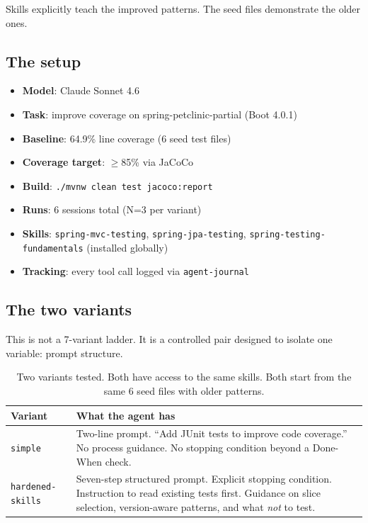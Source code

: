 \documentclass[11pt,a4paper]{article}
\begin{document}
Skills explicitly teach the improved patterns.
The seed files demonstrate the older ones.

\subsection*{The setup}

\begin{itemize}
  \item \textbf{Model}: Claude Sonnet 4.6
  \item \textbf{Task}: improve coverage on spring-petclinic-partial (Boot 4.0.1)
  \item \textbf{Baseline}: 64.9\% line coverage (6 seed test files)
  \item \textbf{Coverage target}: $\geq$85\% via JaCoCo
  \item \textbf{Build}: \texttt{./mvnw clean test jacoco:report}
  \item \textbf{Runs}: 6 sessions total (N=3 per variant)
  \item \textbf{Skills}: \texttt{spring-mvc-testing}, \texttt{spring-jpa-testing},
    \texttt{spring-testing-fundamentals} (installed globally)
  \item \textbf{Tracking}: every tool call logged via \texttt{agent-journal}
\end{itemize}

\subsection*{The two variants}

This is not a 7-variant ladder. It is a controlled pair designed to isolate
one variable: prompt structure.

\begin{table}[H]
\centering
\renewcommand{\arraystretch}{1.2}
\begin{tabular}{@{}l p{9.5cm}@{}}
\toprule
\textbf{Variant} & \textbf{What the agent has} \\
\midrule
\texttt{simple}
  & Two-line prompt. ``Add JUnit tests to improve code coverage.''
    No process guidance. No stopping condition beyond a Done-When check. \\
\texttt{hardened-skills}
  & Seven-step structured prompt. Explicit stopping condition.
    Instruction to read existing tests first. Guidance on slice selection,
    version-aware patterns, and what \emph{not} to test. \\
\bottomrule
\end{tabular}
\caption{Two variants tested. Both have access to the same skills.
Both start from the same 6 seed files with older patterns.}
\end{table}
\end{document}
